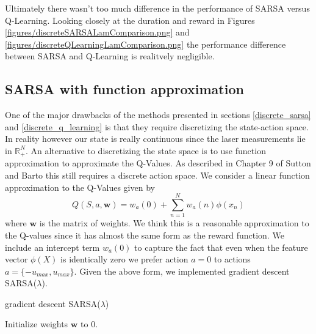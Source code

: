 \documentclass{article}
\begin{document}
Ultimately there wasn't too much difference in the performance of SARSA versus Q-Learning. Looking closely at the duration and reward in Figures \ref{figures/discreteSARSALamComparison.png} and \ref{figures/discreteQLearningLamComparison.png} the performance difference between SARSA and Q-Learning is realitvely negligible.




\subsection{SARSA with function approximation}
\label{sarsa_function_approximation}

One of the major drawbacks of the methods presented in sections \ref{discrete_sarsa} and \ref{discrete_q_learning} is that they require discretizing the state-action space. In reality however our state is really continuous since the laser measurements lie in $\mathbb{R}_+^N$. An alternative to discretizing the state space is to use function approximation to approximate the Q-Values. As described in Chapter 9 of Sutton and Barto \cite{SuttonBarto} this still requires a discrete action space. We consider a linear function approximation to the Q-Values given by
%
%
%
\begin{equation}
\label{q_value_approx}
Q(S,a, \mathbf{w}) = w_a(0) + \sum_{n = 1}^N w_a(n)\phi(x_n)
\end{equation}
%
%
where $\mathbf{w}$ is the matrix of weights. We think this is a reasonable approximation to the Q-values since it has almost the same form as the reward function. We include an intercept term $w_a(0)$ to capture the fact that even when the feature vector $\phi(X)$ is identically zero we prefer action $a = 0$ to actions $a=\{-u_{max},u_{max}\}$. Given the above form, we implemented gradient descent SARSA($\lambda$).
%
%
\begin{algorithm}[H]
   \caption{gradient descent SARSA($\lambda$)}
   \label{alg:gradDescentSARSA}
\begin{algorithmic}
   \STATE Initialize weights $\mathbf{w}$ to $0$.
   \REPEAT

\end{algorithmic}
\end{algorithm}
\end{document}
